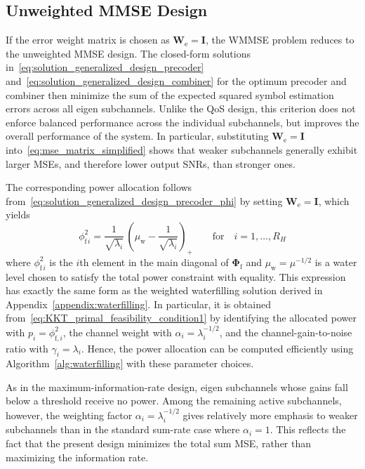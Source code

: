 \subsection{Unweighted MMSE Design}
\label{section:unweighted_mmse_design}
If the error weight matrix is chosen as $\mathbf{W}_{\mathrm{e}} = \mathbf{I}$, the \ac{WMMSE} problem reduces to the unweighted \acf{MMSE} design.
The closed-form solutions in~\eqref{eq:solution_generalized_design_precoder} and~\eqref{eq:solution_generalized_design_combiner} for the optimum precoder and combiner then minimize the sum of the expected squared symbol estimation errors across all eigen subchannels.
Unlike the \ac{QoS} design, this criterion does not enforce balanced performance across the individual subchannels, but improves the overall performance of the system.
In particular, substituting $\mathbf{W}_{\mathrm{e}} = \mathbf{I}$ into~\eqref{eq:mse_matrix_simplified} shows that weaker subchannels generally exhibit larger \acp{MSE}, and therefore lower output \acp{SNR}, than stronger ones.


The corresponding power allocation follows from~\eqref{eq:solution_generalized_design_precoder_phi} by setting $\mathbf{W}_{\mathrm{e}} = \mathbf{I}$, which yields
\begin{equation}
\label{eq:power_allocation_mmse_design}
    \phi_{\mathrm{f} \, i}^2 
    = \frac{1}{\sqrt{\lambda_i}} \, \left(\mu_{\mathrm{w}} - \frac{1}{\sqrt{\lambda_i}}\right)_{+}
    \qquad \text{for} \quad i = 1, \dots, R_H
\end{equation}
where $\phi_{\mathrm{f} \, i}^2$ is the $i$th element in the main diagonal of $\mathbf{\Phi}_{\mathrm{f}}$ and $\mu_{\mathrm{w}} = \mu^{-1/2}$ is a water level chosen to satisfy the total power constraint with equality.
This expression has exactly the same form as the weighted waterfilling solution derived in Appendix~\ref{appendix:waterfilling}. In particular, it is obtained from~\eqref{eq:KKT_primal_feasibility_condition1} by identifying the allocated power with $p_i = \phi_{\mathrm{f},i}^2$, the channel weight with $\alpha_i = \lambda_i^{-1/2}$, and the channel-gain-to-noise ratio with $\gamma_i = \lambda_i$.
Hence, the power allocation can be computed efficiently using Algorithm~\ref{alg:waterfilling} with these parameter choices.

As in the maximum-information-rate design, eigen subchannels whose gains fall below a threshold receive no power. 
Among the remaining active subchannels, however, the weighting factor $\alpha_i = \lambda_i^{-1/2}$ gives relatively more emphasis to weaker subchannels than in the standard sum-rate case where $\alpha_i = 1$.
This reflects the fact that the present design minimizes the total sum \ac{MSE}, rather than maximizing the information rate.


